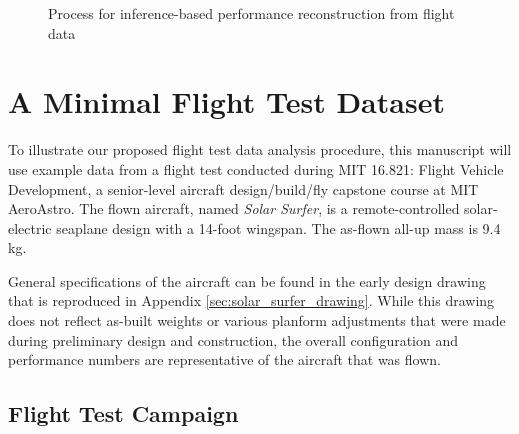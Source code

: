 \documentclass[conf]{new-aiaa}
\begin{document}
    \begin{figure}[!htb]
        \centering
        \caption{Process for inference-based performance reconstruction from flight data}
        \label{fig:overall_procedure}
    \end{figure}


    \section{A Minimal Flight Test Dataset}

    To illustrate our proposed flight test data analysis procedure, this manuscript will use example data from a flight test conducted during MIT 16.821: Flight Vehicle Development, a senior-level aircraft design/build/fly capstone course at MIT AeroAstro. The flown aircraft, named \emph{Solar Surfer}, is a remote-controlled solar-electric seaplane design with a 14-foot wingspan. The as-flown all-up mass is 9.4 kg.

    General specifications of the aircraft can be found in the early design drawing that is reproduced in Appendix \ref{sec:solar_surfer_drawing}. While this drawing does not reflect as-built weights or various planform adjustments that were made during preliminary design and construction, the overall configuration and performance numbers are representative of the aircraft that was flown.

    \subsection{Flight Test Campaign}
\end{document}
